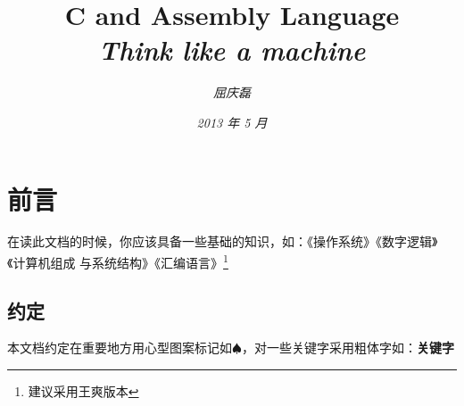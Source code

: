 \documentclass{article}
\begin{document}
\title{%
  {\huge \textsf{C and Assembly Language}\\\smallskip}%
  {\small \textit{Think like a machine}}
}

\author{\textit{屈庆磊}\\[2mm]
       }

\date{\textit{2013 年 5 月}}

\maketitle
\begin{multicols}{2}
\tableofcontents
\end{multicols}
\newpage 

\section{前言}
在读此文档的时候，你应该具备一些基础的知识，如：《操作系统》《数字逻辑》《计算机组成
与系统结构》《汇编语言》\footnote{建议采用王爽版本}
\subsection{约定}
本文档约定在重要地方用心型图案标记如$\spadesuit$，对一些关键字采用粗体字如：\textbf{关键字}
\end{document}
